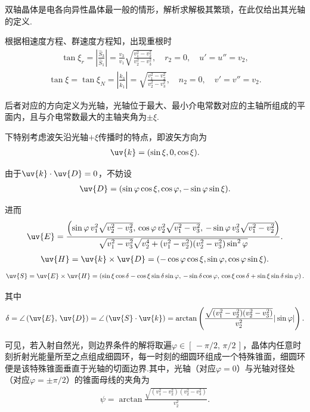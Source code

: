 双轴晶体是电各向异性晶体最一般的情形，解析求解极其繁琐，在此仅给出其光轴的定义.

根据相速度方程、群速度方程知，出现重根时
\begin{align*}
	\tan\xi_r =|\frac{\hat{S}_3}{\hat{S}_1}|=\frac{v_3}{v_1} \sqrt{\frac{v_1^2 - v_2^2}{v_2^2 - v_3^2}},\quad r_2=0,\quad  u'=u''=v_2,
\end{align*}
\begin{align*}
	\tan\xi = \tan\xi_N =|\frac{\hat{k}_3}{\hat{k}_1}|= \sqrt{\frac{v_1^2 - v_2^2}{v_2^2 - v_3^2}},\quad n_2=0,\quad  v'=v''=v_2.
\end{align*}

后者对应的方向定义为光轴，光轴位于最大、最小介电常数对应的主轴所组成的平面内，且与介电常数最大的主轴夹角为\(\pm \xi\).

下特别考虑波矢沿光轴\(+\xi\)传播时的特点，即波矢方向为
\begin{align*}
	\uv{k} = (\sin\xi, 0, \cos\xi).
\end{align*}

由于\(\uv{k}\cdot\uv{D}=0\)，不妨设
\begin{align*}
	\uv{D} = (\sin\varphi \cos\xi, \cos\varphi, -\sin\varphi \sin\xi).
\end{align*}

进而
\begin{align*}
	\uv{E} = \frac{\left( \sin\varphi \, v_1^2 \sqrt{v_2^2 - v_3^2}, \, \cos\varphi \, v_2^2 \sqrt{v_1^2 - v_3^2}, \, -\sin\varphi \, v_3^2 \sqrt{v_1^2 - v_2^2} \right)}{\sqrt{v_1^2 - v_3^2} \sqrt{v_2^4 + (v_1^2 - v_2^2)(v_2^2 - v_3^2) \sin^2\varphi}}.
\end{align*}
\begin{align*}
	\uv{H} =\uv{k}\times\uv{D}= (-\cos\varphi \cos\xi, \sin\varphi, \cos\varphi \sin\xi).
\end{align*}
\begin{align*}
	\uv{S} = \uv{E} \times \uv{H} = \left( \sin\xi \cos\delta - \cos\xi \sin\delta \sin\varphi, \, -\sin\delta \cos\varphi, \, \cos\xi \cos\delta + \sin\xi \sin\delta \sin\varphi \right).
\end{align*}

其中
\begin{align*}
	\delta = \angle\left( \uv{E}, \, \uv{D} \right) = \angle\left( \uv{S} \cdot \uv{k} \right) = \arctan\left( \frac{\sqrt{(v_1^2 - v_2^2)(v_2^2 - v_3^2)}}{v_2^2 } |\sin\varphi|\right).
\end{align*}

可见，若入射自然光，则边界条件的解将取遍\(\varphi\in[\,-\pi/2,\,\pi/2\,]\)，晶体内任意时刻折射光能量所至之点组成细圆环，每一时刻的细圆环组成一个特殊锥面，细圆环便是该特殊锥面垂直于光轴的切面边界.其中，光轴（对应\(\varphi=0\)）与光轴对径处（对应\(\varphi=\pm\pi/2\)）的锥面母线的夹角为
\begin{align*}
	\psi=\arctan\frac{\sqrt{(v_1^2 - v_2^2)(v_2^2 - v_3^2)}}{v_2^2 }.
\end{align*}

